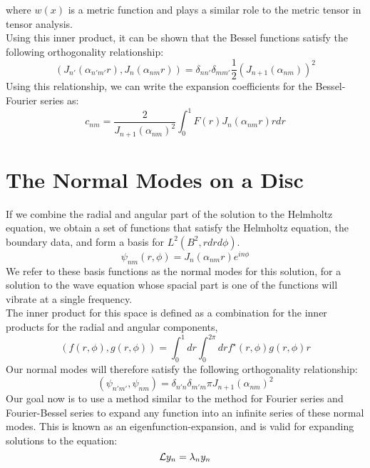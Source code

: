 \documentclass{article}
\begin{document}
where $w(x)$ is a metric function and plays a similar role to the metric tensor in tensor analysis.\\
Using this inner product, it can be shown that the Bessel functions satisfy the following orthogonality relationship:
\begin{equation}
  \boxed{
    \left(J_{n'}(\alpha_{n'm'}r),J_{n}(\alpha_{nm}r)\right) =\delta_{nn'}\delta_{mm'}\frac{1}{2}(J_{n+1}(\alpha_{nm}))^2
  }
\end{equation}
Using this relationship, we can write the expansion coefficients for the Bessel-Fourier series as:
\begin{equation}
  \boxed{
    c_{nm} = \frac{2}{J_{n+1}(\alpha_{nm})^2}\int_0^1 F(r)J_n(\alpha_{nm}r) rdr
  }
\end{equation}
\section{The Normal Modes on a Disc}
If we combine the radial and angular part of the solution to the Helmholtz equation, we obtain a set of functions that satisfy the Helmholtz equation, the boundary data, and form a basis for $L^2(B^2,rdrd\phi)$. 
\begin{equation}
  \boxed{
    \psi_{nm}(r,\phi) = J_n ( \alpha_{nm} r) e^{i n \phi}
  }
\end{equation}
We refer to these basis functions as the normal modes for this solution, for a solution to the wave equation whose spacial part is one of the functions will vibrate at a single frequency.\\
The inner product for this space is defined as a combination for the inner products for the radial and angular components,
\begin{equation}
  \boxed{
    \left(f(r,\phi),g(r,\phi)\right) = \int_0 ^1 dr \int_0 ^{2\pi} dr f^\star(r,\phi) g(r,\phi) r
  }
\end{equation}
Our normal modes will therefore satisfy the following orthogonality relationship:
\begin{equation}
  (\psi_{n'm'},\psi_{nm}) = \delta_{n'n}\delta_{m'm} \pi J_{n+1}( \alpha_{nm } )^2
\end{equation}
Our goal now is to use a method similar to the method for Fourier series and Fourier-Bessel series to expand any function into an infinite series of these normal modes. This is known as an eigenfunction-expansion, and is valid for expanding solutions to the equation:
\begin{equation}
  \mathcal{L} y_n = \lambda_n y_n
\end{equation}
\end{document}
